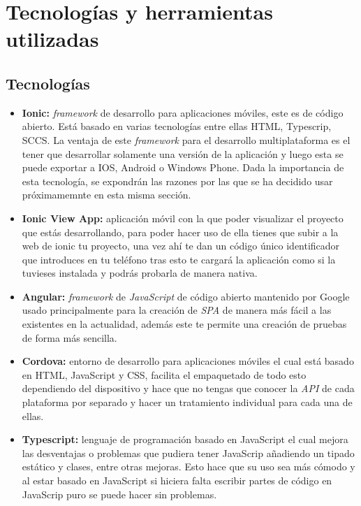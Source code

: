 \section{Tecnologías y herramientas utilizadas}
\subsection{Tecnologías}
\begin{itemize}
    \item\textbf{Ionic:} \textit{framework} de desarrollo para aplicaciones móviles, este es
    de código abierto. Está basado en varias tecnologías entre ellas HTML, Typescrip, SCCS. La
    ventaja de este \textit{framework} para el desarrollo multiplataforma es el tener que
    desarrollar solamente una versión de la aplicación y luego esta se puede exportar a IOS,
    Android o Windows Phone. Dada la importancia de esta tecnología, se expondrán las razones
    por las que se ha decidido usar próximamemnte en esta misma sección.
    \item\textbf{Ionic View App:} aplicación móvil con la que poder visualizar el proyecto que
    estás desarrollando, para poder hacer uso de ella tienes que subir a la web de ionic tu
    proyecto, una vez ahí te dan un código único identificador que introduces en tu teléfono
    tras esto te cargará la aplicación como si la tuvieses instalada y podrás probarla de manera
    nativa.
    \item\textbf{Angular:} \textit{framework} de \textit{JavaScript} de código abierto mantenido
    por Google usado principalmente para la creación de \textit{SPA}\cite{SPA} de manera más fácil
    a las existentes en la actualidad, además este te permite una creación de pruebas de forma más
    sencilla.
    \item\textbf{Cordova:} entorno de desarrollo para aplicaciones móviles el cual está basado en
    HTML, JavaScript y CSS, facilita el empaquetado de todo esto dependiendo del dispositivo y
    hace que no tengas que conocer la \textit{API}\cite{api} de cada plataforma por separado y
    hacer un tratamiento individual para cada una de ellas.
    \item\textbf{Typescript:} lenguaje de programación basado en JavaScript el cual mejora las
    desventajas o problemas que pudiera tener JavaScrip añadiendo un tipado estático y clases,
    entre otras mejoras. Esto hace que su uso sea más cómodo y al estar basado en JavaScript si
    hiciera falta escribir partes de código en JavaScrip puro se puede hacer sin problemas.

\end{itemize}
